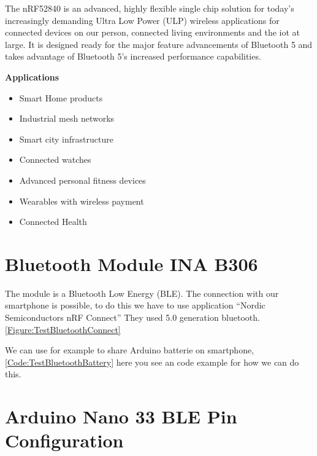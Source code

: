 The nRF52840 is an advanced, highly flexible single chip solution for today’s increasingly demanding Ultra Low Power (ULP) wireless applications for connected devices on our person, connected living environments and the \ac{iot} at large. It is designed ready for the major feature
advancements of Bluetooth 5 and takes advantage of Bluetooth 5's increased performance capabilities. \cite{Arduino:2021b}

\textbf{Applications}

\begin{itemize}
    \item Smart Home products
    \item Industrial mesh networks
    \item Smart city infrastructure
    \item Connected watches
    \item Advanced personal fitness devices
    \item Wearables with wireless payment
    \item Connected Health
\end{itemize}


\section{Bluetooth Module INA B306}

The module is a Bluetooth Low Energy (BLE). The connection with our smartphone is possible, to do this we have to use application ``Nordic Semiconductors nRF Connect'' They used 5.0 generation bluetooth. \ref{Figure:TestBluetoothConnect} 

\begin{center}
    \label{Figure:TestBluetoothConnect}
\end{center}		

We can use for example to share Arduino batterie on smartphone, \ref{Code:TestBluetoothBattery} here you see an code example for how we can do this.

\begin{center}
    \label{Code:TestBluetoothBattery}
\end{center}




\section{Arduino Nano 33 BLE Pin Configuration}

